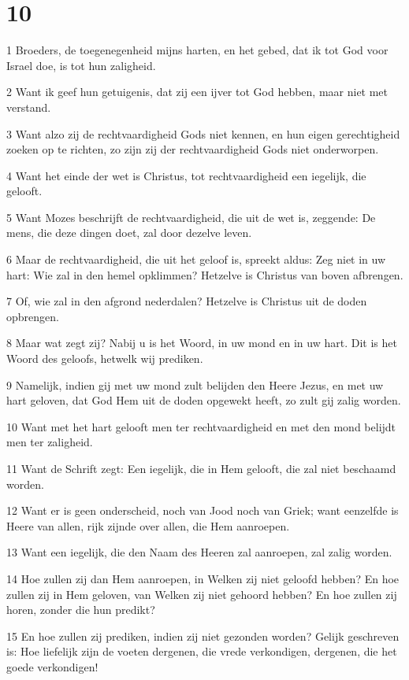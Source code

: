 \chapter{10}

\par 1 Broeders, de toegenegenheid mijns harten, en het gebed, dat ik tot God voor Israel doe, is tot hun zaligheid.
\par 2 Want ik geef hun getuigenis, dat zij een ijver tot God hebben, maar niet met verstand.
\par 3 Want alzo zij de rechtvaardigheid Gods niet kennen, en hun eigen gerechtigheid zoeken op te richten, zo zijn zij der rechtvaardigheid Gods niet onderworpen.
\par 4 Want het einde der wet is Christus, tot rechtvaardigheid een iegelijk, die gelooft.
\par 5 Want Mozes beschrijft de rechtvaardigheid, die uit de wet is, zeggende: De mens, die deze dingen doet, zal door dezelve leven.
\par 6 Maar de rechtvaardigheid, die uit het geloof is, spreekt aldus: Zeg niet in uw hart: Wie zal in den hemel opklimmen? Hetzelve is Christus van boven afbrengen.
\par 7 Of, wie zal in den afgrond nederdalen? Hetzelve is Christus uit de doden opbrengen.
\par 8 Maar wat zegt zij? Nabij u is het Woord, in uw mond en in uw hart. Dit is het Woord des geloofs, hetwelk wij prediken.
\par 9 Namelijk, indien gij met uw mond zult belijden den Heere Jezus, en met uw hart geloven, dat God Hem uit de doden opgewekt heeft, zo zult gij zalig worden.
\par 10 Want met het hart gelooft men ter rechtvaardigheid en met den mond belijdt men ter zaligheid.
\par 11 Want de Schrift zegt: Een iegelijk, die in Hem gelooft, die zal niet beschaamd worden.
\par 12 Want er is geen onderscheid, noch van Jood noch van Griek; want eenzelfde is Heere van allen, rijk zijnde over allen, die Hem aanroepen.
\par 13 Want een iegelijk, die den Naam des Heeren zal aanroepen, zal zalig worden.
\par 14 Hoe zullen zij dan Hem aanroepen, in Welken zij niet geloofd hebben? En hoe zullen zij in Hem geloven, van Welken zij niet gehoord hebben? En hoe zullen zij horen, zonder die hun predikt?
\par 15 En hoe zullen zij prediken, indien zij niet gezonden worden? Gelijk geschreven is: Hoe liefelijk zijn de voeten dergenen, die vrede verkondigen, dergenen, die het goede verkondigen!
